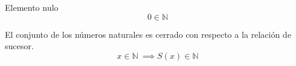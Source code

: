 \begin{axiom} \label{nat_zero}
	Elemento nulo
	\begin{equation}
		0 \in \mathbb{N}
	\end{equation}
\end{axiom}
\begin{axiom} \label{nat_closure}
	El conjunto de los números naturales es cerrado con respecto a la relación de sucesor.
	\begin{equation}
		x \in \mathbb{N}\ \implies S(x) \in \mathbb{N}
	\end{equation}
\end{axiom}
